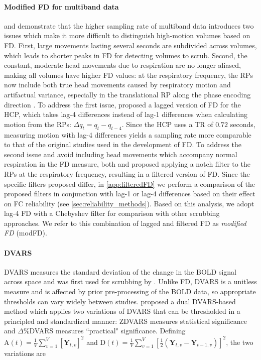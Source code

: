 \documentclass{article}
\begin{document}
\paragraph{Modified FD for multiband data}\label{sec:modFD} \cite{power2019distinctions} and \cite{fairCorrectionRespiratoryArtifacts2020} demonstrate that the higher sampling rate of multiband data introduces two issues which make it more difficult to distinguish high-motion volumes based on FD. First, large movements lasting several seconds are subdivided across volumes, which leads to shorter peaks in FD for detecting volumes to scrub. Second, the constant, moderate head movements due to respiration are no longer aliased, making all volumes have higher FD values: at the respiratory frequency, the RPs now include both true head movements caused by respiratory motion and artifactual variance, especially in the translational RP along the phase encoding direction \citep{fairCorrectionRespiratoryArtifacts2020}. To address the first issue, \cite{power2019distinctions} proposed a lagged version of FD for the HCP, which takes lag-4 differences instead of lag-1 differences when calculating motion from the RPs: $\Delta q_t = q_t - q_{t-4}$. Since the HCP uses a TR of $0.72$ seconds, measuring motion with lag-4 differences yields a sampling rate more comparable to that of the original studies used in the development of FD.  To address the second issue and avoid including head movements which accompany normal respiration in the FD measure, both \cite{power2019distinctions} and \cite{fairCorrectionRespiratoryArtifacts2020} proposed applying a notch filter to the RPs at the respiratory frequency, resulting in a filtered version of FD. Since the specific filters proposed differ, in \autoref{app:filteredFD} we perform a comparison of the proposed filters in conjunction with lag-1 or lag-4 differences based on their effect on FC reliability (see \autoref{sec:reliability_methods}). Based on this analysis, we adopt lag-4 FD with a Chebyshev filter for comparison with other scrubbing approaches. We refer to this combination of lagged and filtered FD as \textit{modified FD} (modFD).

\paragraph{DVARS} 
DVARS measures the standard deviation of the change in the BOLD signal across space and was first used for scrubbing by \cite{smyserLongitudinalAnalysisNeural2010}. Unlike FD, DVARS is a unitless measure and is affected by prior pre-processing of the BOLD data, so appropriate thresholds can vary widely between studies. \cite{afyouniInsightInferenceDVARS2018} proposed a dual DVARS-based method which applies two variations of DVARS that can be thresholded in a principled and standardized manner: ZDVARS measures statistical significance and $\Delta$\%DVARS measures ``practical" significance. Defining
$
\text{A}(t) = \frac{1}{V} \sum_{v=1}^V [\textbf{Y}_{t,v}]^2$ and
$\text{D}(t) = \frac{1}{V} \sum_{v=1}^V [\frac{1}{2} (\textbf{Y}_{t,v} - \textbf{Y}_{t-1,v})]^2
$,
the two variations are
\end{document}
